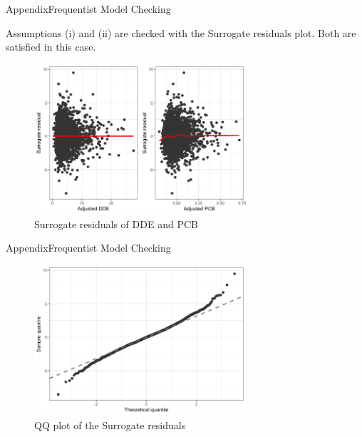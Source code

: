 \documentclass{beamer}\usepackage[]{graphicx}\usepackage[]{color}
\makeatletter
\newenvironment{kframe}{%
 \def\at@end@of@kframe{}%
 \ifinner\ifhmode%
  \def\at@end@of@kframe{\end{minipage}}%
  \begin{minipage}{\columnwidth}%
 \fi\fi%
 \def\FrameCommand##1{\hskip\@totalleftmargin \hskip-\fboxsep
 \colorbox{shadecolor}{##1}\hskip-\fboxsep
     \hskip-\linewidth \hskip-\@totalleftmargin \hskip\columnwidth}%
 \MakeFramed {\advance\hsize-\width
   \@totalleftmargin\z@ \linewidth\hsize
   \@setminipage}}%
 {\par\unskip\endMakeFramed%
 \at@end@of@kframe}
\newenvironment{knitrout}{}{} %
\makeatother
\begin{document}
\begin{frame}{Appendix}{Frequentist Model Checking}
\begin{knitrout}
\color{fgcolor}\begin{kframe}


{\ttfamily\noindent\bfseries\color{errorcolor}{\#\# Error in eval(lhs, parent, parent): object 'd' not found}}

{\ttfamily\noindent\bfseries\color{errorcolor}{\#\# Error in eval(expr, p): object 'd\_subset' not found}}\end{kframe}
\end{knitrout}
Assumptions (i) and (ii) are checked with the Surrogate residuals plot. Both are satisfied in this case.
\begin{figure}
  \centering
  \includegraphics[width=0.7\textwidth]{Surrogate_residuals.png}
\caption{Surrogate residuals of DDE and PCB}
\label{fig:surrogateresid}
\end{figure}
\end{frame}
\begin{frame}{Appendix}{Frequentist Model Checking}

\begin{figure}
  \centering
  \includegraphics[width=0.7\textwidth]{qqplot.png}
\caption{QQ plot of the Surrogate residuals}
\label{fig:qqplot}
\end{figure}
\end{frame}
\end{document}

